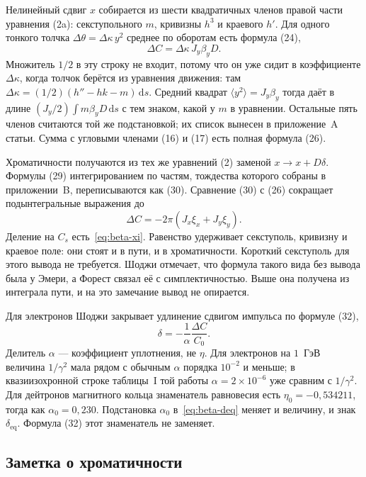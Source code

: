\documentclass[aps,pra,preprint,a4paper,amsmath,amssymb,longbibliography]{revtex4-2}
\begin{document}
Нелинейный сдвиг $x$ собирается из шести квадратичных членов правой части уравнения (2a): секступольного $m$, кривизны $h^3$ и краевого $h'$. Для одного тонкого толчка $\Delta\theta=\Delta\kappa\, y^2$ среднее по оборотам есть формула (24),
\begin{equation}
\label{eq:beta-shoji-24}
\Delta C=\Delta\kappa\, J_y\beta_y D.
\end{equation}
Множитель $1/2$ в эту строку не входит, потому что он уже сидит в коэффициенте $\Delta\kappa$, когда толчок берётся из уравнения движения: там $\Delta\kappa=(1/2)(h''-hk-m)\,\mathrm{d}s$. Средний квадрат $\langle y^2\rangle=J_y\beta_y$ тогда даёт в длине $(J_y/2)\int m\beta_y D\,\mathrm{d}s$ с тем знаком, какой у $m$ в уравнении. Остальные пять членов считаются той же подстановкой; их список вынесен в приложение~A статьи. Сумма с угловыми членами (16) и (17) есть полная формула (26).

Хроматичности получаются из тех же уравнений (2) заменой $x\to x+D\delta$. Формулы (29) интегрированием по частям, тождества которого собраны в приложении~B, переписываются как (30). Сравнение (30) с (26) сокращает подынтегральные выражения до
\begin{equation}
\label{eq:beta-shoji-31}
\Delta C=-2\pi(J_x\xi_x+J_y\xi_y).
\end{equation}
Деление на $C_s$ есть~\eqref{eq:beta-xi}. Равенство удерживает секступоль, кривизну и краевое поле: они стоят и в пути, и в хроматичности. Короткий секступоль для этого вывода не требуется. Шоджи отмечает, что формула такого вида без вывода была у Эмери, а Форест связал её с симплектичностью. Выше она получена из интеграла пути, и на это замечание вывод не опирается.

Для электронов Шоджи закрывает удлинение сдвигом импульса по формуле (32),
\begin{equation}
\label{eq:beta-shoji-32}
\delta=-\frac{1}{\alpha}\frac{\Delta C}{C_0}.
\end{equation}
Делитель $\alpha$ --- коэффициент уплотнения, не $\eta$. Для электронов на $1$~ГэВ величина $1/\gamma^2$ мала рядом с обычным $\alpha$ порядка $10^{-2}$ и меньше; в квазиизохронной строке таблицы~I той работы $\alpha=2\times 10^{-6}$ уже сравним с $1/\gamma^2$. Для дейтронов магнитного кольца знаменатель равновесия есть $\eta_0=-0{,}534211$, тогда как $\alpha_0=0{,}230$. Подстановка $\alpha_0$ в~\eqref{eq:beta-deq} меняет и величину, и знак $\delta_{\mathrm{eq}}$. Формула (32) этот знаменатель не заменяет.

\subsection{Заметка о хроматичности}
\label{sec:ch2-note}
\end{document}
